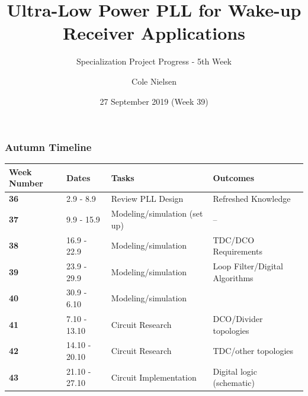 \documentclass[t, screen, aspectratio=43]{beamer}
\title[Short title]{Ultra-Low Power PLL for Wake-up Receiver Applications}
\subtitle{Specialization Project Progress - 5th Week}
\author[C Nielsen]{Cole Nielsen}
\institute[NTNU]{Department of Electronic Systems, NTNU}
\date{27 September 2019 (Week 39)}
\begin{document}
\begin{frame}
	\titlepage%
\end{frame}


\begin{frame}
	\frametitle{Autumn Timeline}
	\begin{table}[htb!]
		\tiny
		\centering
		\vspace{-1em}
		\def\arraystretch{1.5}		
		\setlength\arrayrulewidth{0.75pt}
		\setlength{\tabcolsep}{1em} %
		\begin{tabular}{|l|l|l|l|}
			\hline 
			\rule[-1ex]{0pt}{2.5ex} \cellcolor{gray!40}\textbf{Week Number} & \cellcolor{gray!40}\textbf{Dates} &\cellcolor{gray!40}\textbf{Tasks} & \cellcolor{gray!40}\textbf{Outcomes}\\ 
			\hline 
			\rule[-1ex]{0pt}{2.5ex} \cellcolor{red!20}\textbf{36}& \cellcolor{red!20}2.9 - 8.9 & \cellcolor{red!20}Review PLL Design & \cellcolor{red!20}Refreshed Knowledge\\ 
			\hline 
			\rule[-1ex]{0pt}{2.5ex} \cellcolor{red!20}\textbf{37}& \cellcolor{red!20}9.9 - 15.9 & \cellcolor{red!20}Modeling/simulation (set up) & \cellcolor{red!20}--\\ 
			\hline 
			\rule[-1ex]{0pt}{2.5ex} \cellcolor{red!20}\textbf{38}& \cellcolor{red!20}16.9 - 22.9 & \cellcolor{red!20}Modeling/simulation &\cellcolor{red!20} TDC/DCO Requirements\\ 
			\hline 
			\rule[-1ex]{0pt}{2.5ex} \cellcolor{green!20}\textbf{39}& \cellcolor{green!20}23.9 - 29.9& \cellcolor{green!20}Modeling/simulation& \cellcolor{green!20}Loop Filter/Digital Algorithms\\ 
			\hline 
			\rule[-1ex]{0pt}{2.5ex} \cellcolor{blue!20}\textbf{40}& \cellcolor{blue!20}30.9 - 6.10& \cellcolor{blue!20}Modeling/simulation& \cellcolor{blue!20}\color{red}{\textbf{Loop filter,}} \color{black}{Ideal implementation in Cadence}\\ 
			\hline 
			\rule[-1ex]{0pt}{2.5ex} \textbf{41}& 7.10 - 13.10& Circuit Research & DCO/Divider topologies\\ 
			\hline 
			\rule[-1ex]{0pt}{2.5ex} \textbf{42}& 14.10 - 20.10& Circuit Research & TDC/other topologies\\ 
			\hline 
			\rule[-1ex]{0pt}{2.5ex} \textbf{43}& 21.10 - 27.10& Circuit Implementation& Digital logic (schematic)\\ 

\end{tabular}
\end{table}
\end{frame}
\end{document}
